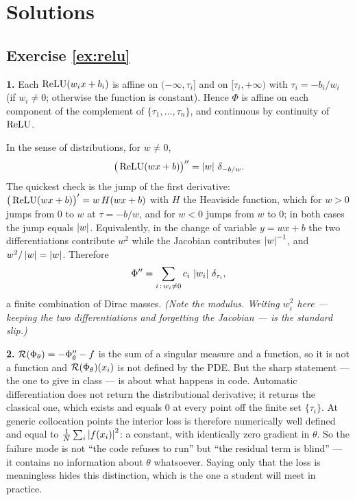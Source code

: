 \documentclass[11pt,a4paper]{article}
\begin{document}
\ifsolutions
\newpage
\section{Solutions}

\subsection*{Exercise \ref{ex:relu}}

\textbf{1.} Each $\operatorname{ReLU}(w_i x + b_i)$ is affine on $(-\infty, \tau_i]$ and on $[\tau_i,+\infty)$
with $\tau_i = -b_i/w_i$ (if $w_i \ne 0$; otherwise the function is constant). Hence $\Phi$ is
affine on each component of the complement of $\{\tau_1,\dots,\tau_n\}$, and continuous by
continuity of $\operatorname{ReLU}$.

In the sense of distributions, for $w \ne 0$,
\[
\big(\operatorname{ReLU}(w x + b)\big)'' = \left\lvert w \right\rvert\,\delta_{-b/w}.
\]
The quickest check is the jump of the first derivative: $\big(\operatorname{ReLU}(wx+b)\big)' = w\,H(wx+b)$ with
$H$ the Heaviside function, which for $w > 0$ jumps from $0$ to $w$ at $\tau = -b/w$, and for
$w < 0$ jumps from $w$ to $0$; in both cases the jump equals $\left\lvert w \right\rvert$. Equivalently, in the change
of variable $y = wx+b$ the two differentiations contribute $w^2$ while the Jacobian contributes
$\left\lvert w \right\rvert^{-1}$, and $w^2/\left\lvert w \right\rvert = \left\lvert w \right\rvert$. Therefore
\[
\Phi'' = \sum_{i \,:\, w_i \ne 0} c_i\, \left\lvert w_i \right\rvert\, \delta_{\tau_i},
\]
a finite combination of Dirac masses. \emph{(Note the modulus. Writing $w_i^2$ here --- keeping the
two differentiations and forgetting the Jacobian --- is the standard slip.)}

\textbf{2.} $\mathcal{R}(\Phi_\theta) = -\Phi_\theta'' - f$ is the sum of a singular measure and a function,
so it is not a function and $\mathcal{R}(\Phi_\theta)(x_i)$ is not defined by the PDE. But the sharp
statement --- the one to give in class --- is about what happens in code. Automatic differentiation
does not return the distributional derivative; it returns the classical one, which exists and equals
$0$ at every point off the finite set $\{\tau_i\}$. At generic collocation points the interior loss
is therefore numerically well defined and equal to $\frac1N\sum_i \left\lvert f(x_i) \right\rvert^2$: a constant, with
identically zero gradient in $\theta$. So the failure mode is not ``the code refuses to run'' but
``the residual term is blind'' --- it contains no information about $\theta$ whatsoever. Saying only
that the loss is meaningless hides this distinction, which is the one a student will meet in
practice.
\end{document}
